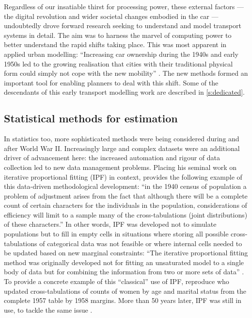 Regardless of our insatiable thirst for processing power, these external factors
--- the digital revolution and wider societal changes embodied in the
car --- undoubtedly drove forward research seeking to understand and model
transport systems in detail. The aim was to harness the marvel of computing
power to better understand the rapid shifts taking place.
This was most apparent in applied urban modelling: ``Increasing car
ownership during the 1940s and early 1950s led to the growing realisation
that cities with their traditional physical form could simply not cope
with the new mobility'' \citep[p.~6]{batty1976urban}. The new methods formed an
important tool for enabling planners to deal with this shift.
Some of the descendants of this early transport modelling work are described in
\cref{s:dedicated}.

\subsection{Statistical methods for estimation}
In statistics too, more
sophisticated methods were being considered during and after World War II.
Increasingly large and complex
datasets were an additional driver of advancement here: the increased automation
and rigour of data collection led to new data management
problems. Placing his seminal work on iterative proportional fitting (IPF) in
context, \citet[p.~427]{Deming1940} provides the following example of this
data-driven methodological development:
``in the 1940 census of population a problem of adjustment arises from the fact
that although there will be a complete count of certain characters for the
individuals in the population, considerations of efficiency will limit to a
sample many of the cross-tabulations (joint distributions) of these
characters.'' In other words, IPF was developed not to simulate populations but
to fill in empty cells in situations where storing all possible cross-tabulations of
categorical data was not feasible or where internal cells needed to be
updated based on new marginal constraints:
``The iterative proportional fitting method was originally
developed not for fitting
an unsaturated model to a single body of data but for combining the information
from two or more sets of data'' \citep[p.~97]{bishop2007discrete}. To provide a
concrete example of this ``classical'' use of IPF, \citet{bishop2007discrete}
reproduce \citet{Friedlander1961-ipf} who updated cross-tabulations of
counts of women by age and marital status from the complete 1957 table by 1958
margins. More than 50 years later, IPF was still in use, to
tackle the same issue \citep{Jirousek1995}.

